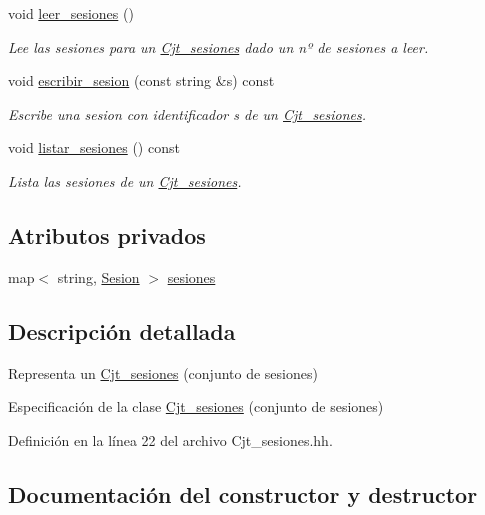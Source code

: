\begin{DoxyCompactItemize}
void \mbox{\hyperlink{class_cjt__sesiones_ac550e55acf1c249058d274214ba8f655}{leer\+\_\+sesiones}} ()
\begin{DoxyCompactList}\small\item\em Lee las sesiones para un \mbox{\hyperlink{class_cjt__sesiones}{Cjt\+\_\+sesiones}} dado un nº de sesiones a leer. \end{DoxyCompactList}\item 
void \mbox{\hyperlink{class_cjt__sesiones_ab3d1427eaac58e65fa341d60f9e2a3b3}{escribir\+\_\+sesion}} (const string \&s) const
\begin{DoxyCompactList}\small\item\em Escribe una sesion con identificador s de un \mbox{\hyperlink{class_cjt__sesiones}{Cjt\+\_\+sesiones}}. \end{DoxyCompactList}\item 
void \mbox{\hyperlink{class_cjt__sesiones_a58e65694f1e4b544ae3c3e85cf329eeb}{listar\+\_\+sesiones}} () const
\begin{DoxyCompactList}\small\item\em Lista las sesiones de un \mbox{\hyperlink{class_cjt__sesiones}{Cjt\+\_\+sesiones}}. \end{DoxyCompactList}\end{DoxyCompactItemize}
\subsection*{Atributos privados}
\begin{DoxyCompactItemize}
\item 
map$<$ string, \mbox{\hyperlink{class_sesion}{Sesion}} $>$ \mbox{\hyperlink{class_cjt__sesiones_a87e835a62e561eeb0f93eedbdcbe1802}{sesiones}}
\end{DoxyCompactItemize}


\subsection{Descripción detallada}
Representa un \mbox{\hyperlink{class_cjt__sesiones}{Cjt\+\_\+sesiones}} (conjunto de sesiones) 

Especificación de la clase \mbox{\hyperlink{class_cjt__sesiones}{Cjt\+\_\+sesiones}} (conjunto de sesiones) 

Definición en la línea 22 del archivo Cjt\+\_\+sesiones.\+hh.



\subsection{Documentación del constructor y destructor}
\mbox{\label{class_cjt__sesiones_a70107165db028c20e245f02958a47be1}} 
